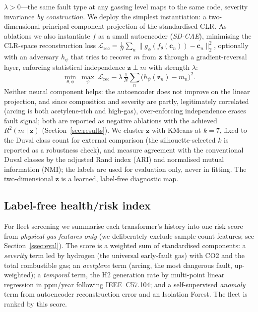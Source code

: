 $\lambda>0$---the same fault type at any gassing level maps to the same code, severity invariance
\emph{by construction}. We deploy the simplest instantiation: a two-dimensional
principal-component projection of the standardised CLR. As ablations we also instantiate $f$ as
a small autoencoder (\emph{SD-CAE}), minimising the CLR-space reconstruction loss
$\mathcal{L}_{\text{rec}}=\frac1N\sum_n\lVert g_\phi(f_\theta(\mathbf{c}_n))-\mathbf{c}_n\rVert_2^2$,
optionally with an adversary $h_\psi$ that tries to recover $m$ from $\mathbf{z}$ through a
gradient-reversal layer, enforcing statistical independence $\mathbf{z}\perp m$ with strength
$\lambda$:
\begin{equation}
\min_{\theta,\phi}\ \max_{\psi}\
\mathcal{L}_{\text{rec}} - \lambda\,\tfrac{1}{N}\sum_{n}\bigl(h_\psi(\mathbf{z}_n)-m_n\bigr)^{2}.
\end{equation}
Neither neural component helps: the autoencoder does not improve on the linear projection, and
since composition and severity are partly, legitimately correlated (arcing is both
acetylene-rich and high-gas), over-enforcing independence erases fault signal; both are reported
as negative ablations with the achieved $R^2(m\mid\mathbf{z})$ (Section~\ref{sec:results}).
We cluster $\mathbf{z}$ with KMeans at $k=7$, fixed to the Duval class count for external
comparison (the silhouette-selected $k$ is reported as a robustness check), and measure
agreement with the conventional Duval classes by the adjusted Rand index (ARI) and normalised
mutual information (NMI); the labels are used for evaluation only, never in fitting.
The two-dimensional $\mathbf{z}$ is a learned, label-free diagnostic map.

\subsection{Label-free health/risk index}
\label{ssec:index}
For fleet screening we summarise each transformer's history into one risk score from
\emph{physical gas features only} (we deliberately exclude sample-count features; see
Section~\ref{ssec:eval}). The score is a weighted sum of standardised components: a
\emph{severity} term led by hydrogen (the universal early-fault gas) with CO2 and the total
combustible gas; an \emph{acetylene} term (arcing, the most dangerous fault, up-weighted);
a \emph{temporal} term, the H2 generation rate by multi-point linear regression in ppm/year
following IEEE~C57.104; and a self-supervised \emph{anomaly} term from autoencoder
reconstruction error and an Isolation Forest. The fleet is ranked by this score.

